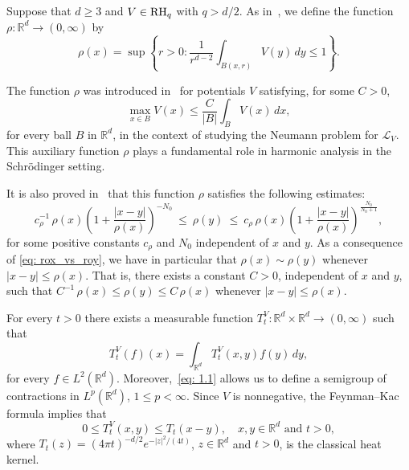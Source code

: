 \documentclass[10pt, a4paper, reqno]{amsart}
\theoremstyle{definition}
\theoremstyle{remark}
\newcommand{\RH}{\textup{RH}}
\numberwithin{equation}{section}
\begin{document}
Suppose that $d \geq 3$ and $V \in \RH_q$ with $q > d/2$. As in~\cite[Eq.~(0.14)]{Shen95}, we define the function $\rho: \mathbb{R}^d \rightarrow (0,\infty)$ by
\begin{equation*}
    \rho(x) = \sup\left\{ r > 0 : \frac{1}{r^{d-2}} \int_{B(x,r)} V(y) \, dy \leq 1 \right\}.
\end{equation*}

The function $\rho$ was introduced in~\cite{Shen94} for potentials $V$ satisfying, for some $C > 0$, 
\begin{equation*}
    \max_{x \in B} V(x) \leq \frac{C}{|B|} \int_B V(x) \, dx,
\end{equation*}
for every ball $B$ in $\mathbb{R}^d$, in the context of studying the Neumann problem for $\mathcal{L}_V$. This auxiliary function $\rho$ plays a fundamental role in harmonic analysis in the Schr\"odinger setting.

It is also proved in~\cite{Shen94} that this function $\rho$ satisfies the following estimates: \begin{equation}\label{eq: rox_vs_roy} c_\rho^{-1} \, \rho(x)\left(1+\frac{|x-y|}{\rho(x)}\right)^{-N_0} \ \leq \ \rho(y) \ \leq \ c_\rho\,\rho(x)\left(1+\frac{|x-y|}{\rho(x)}\right)^{\frac{N_0}{N_0+1}}, \end{equation} for some positive constants $c_\rho$ and $N_0$ independent of $x$ and $y$.
As a consequence of \eqref{eq: rox_vs_roy}, we have in particular that $\rho(x)\sim \rho(y)$ whenever $|x-y|\leq \rho(x)$. That is, there exists a constant $C>0$, independent of $x$ and $y$, such that
$
C^{-1}\,\rho(x) \leq \rho(y) \leq C\,\rho(x)
$ whenever $|x-y|\leq \rho(x)$.

For every $t > 0$ there exists a measurable function $T_t^V : \mathbb{R}^d \times \mathbb{R}^d \rightarrow (0,\infty)$ such that
\begin{equation}\label{eq: 1.1}
    T_t^V(f)(x) = \int_{\mathbb{R}^d} T_t^V(x,y) f(y) \, dy,
\end{equation}
for every $f \in L^2(\mathbb{R}^d)$. Moreover,~\eqref{eq: 1.1} allows us to define a semigroup of contractions in $L^p(\mathbb{R}^d)$, ${1 \leq  p < \infty}$. Since $V$ is nonnegative, the Feynman--Kac formula implies that
\begin{equation}\label{eq: 1.2}
    0 \leq T_t^V(x,y) \leq T_t(x-y), \quad x, y \in \mathbb{R}^d \text{ and } t > 0,
\end{equation}
where $T_t(z) = (4\pi t)^{-d/2} e^{-|z|^2/(4t)}$, $z \in \mathbb{R}^d$ and $t > 0$, is the classical heat kernel.
\end{document}
